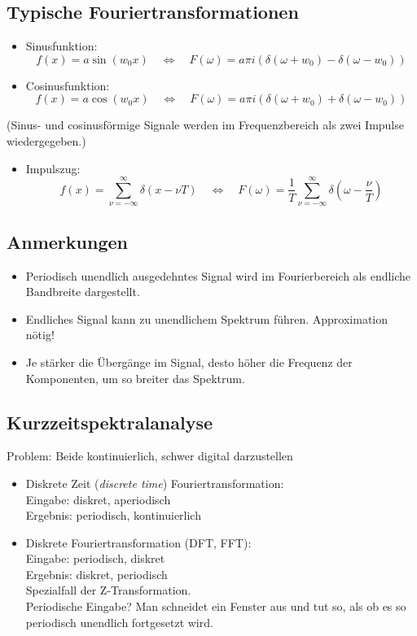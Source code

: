 \subsection{Typische Fouriertransformationen}
\begin{itemize}
\item Sinusfunktion: $$f(x) = a \sin(w_0 x) \quad \Leftrightarrow \quad F(\omega) = a \pi i (\delta(\omega + w_0) - \delta(\omega - w_0))$$
\item Cosinusfunktion: $$f(x) = a \cos(w_0 x) \quad \Leftrightarrow \quad F(\omega) = a \pi i (\delta(\omega + w_0) + \delta(\omega - w_0))$$
\end{itemize}
(Sinus- und cosinusförmige Signale werden im Frequenzbereich als zwei Impulse wiedergegeben.)
\begin{itemize}
\item Impulszug: $$f(x) = \sum\limits_{\nu = -\infty}^{\infty} \delta(x - \nu T) \quad \Leftrightarrow \quad F(\omega) = \frac{1}{T} \sum\limits_{\nu = -\infty}^{\infty} \delta(\omega - \frac{\nu}{T})$$
\end{itemize}

\subsection{Anmerkungen}
\begin{itemize}
\item Periodisch unendlich ausgedehntes Signal wird im Fourierbereich als endliche Bandbreite dargestellt.
\item Endliches Signal kann zu unendlichem Spektrum führen. Approximation nötig!
\item Je stärker die Übergänge im Signal, desto höher die Frequenz der Komponenten, um so breiter das Spektrum.
\end{itemize}


\subsection{Kurzzeitspektralanalyse}

Problem: Beide kontinuierlich, schwer digital darzustellen
\begin{itemize}
\item Diskrete Zeit (\textsl{discrete time}) Fouriertransformation: \\ Eingabe: diskret, aperiodisch \\ Ergebnis: periodisch, kontinuierlich
\item Diskrete Fouriertransformation (DFT, FFT): \\ Eingabe: periodisch, diskret \\ Ergebnis: diskret, periodisch \\ Spezialfall der Z-Transformation. \\ Periodische Eingabe? Man schneidet ein Fenster aus und tut so, als ob es so periodisch unendlich fortgesetzt wird.
\end{itemize}

